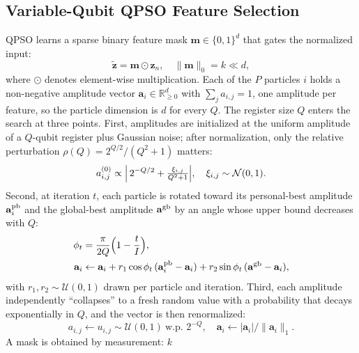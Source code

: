 \documentclass[conference]{IEEEtran}
\begin{document}
\subsection{Variable-Qubit QPSO Feature Selection}
\label{subsec:qpsomethod}

QPSO learns a sparse binary feature mask
$\mathbf{m}\in\{0,1\}^d$ that gates the normalized input:
\begin{equation}
\tilde{\mathbf{z}} = \mathbf{m}\odot\mathbf{z}_n,\quad
\|\mathbf{m}\|_0 = k \ll d,
\label{eq:mask_gate}
\end{equation}
where $\odot$ denotes element-wise multiplication.
Each of the $P$ particles $i$ holds a
non-negative amplitude vector $\mathbf{a}_i\in\mathbb{R}_{\ge 0}^{d}$
with $\sum_j a_{i,j}=1$, one amplitude per feature, so the particle
dimension is $d$ for every $Q$. The register size $Q$ enters the
search at three points. First, amplitudes are initialized at the
uniform amplitude of a $Q$-qubit register plus Gaussian noise; after
normalization, only the relative perturbation
$\rho(Q)=2^{Q/2}/(Q^{2}+1)$ matters:
\begin{equation}
a_{i,j}^{(0)} \propto \Bigl|\,2^{-Q/2} +
\tfrac{\xi_{i,j}}{Q^{2}+1}\Bigr|,\quad
\xi_{i,j}\sim\mathcal{N}(0,1).
\label{eq:qpso_init}
\end{equation}
Second, at iteration $t$, each particle is
rotated toward its personal-best amplitude $\mathbf{a}_i^{\rm pb}$
and the global-best amplitude $\mathbf{a}^{\rm gb}$ by an angle whose
upper bound decreases with $Q$:
\begin{align}
\phi_t &= \frac{\pi}{2Q}\Bigl(1-\frac{t}{I}\Bigr),
\label{eq:qpso_angle}\\
\mathbf{a}_i &\leftarrow \mathbf{a}_i
+ r_1\cos\phi_t\,(\mathbf{a}_i^{\rm pb}-\mathbf{a}_i)
+ r_2\sin\phi_t\,(\mathbf{a}^{\rm gb}-\mathbf{a}_i),
\label{eq:qpso_rotation}
\end{align}
with $r_1,r_2\sim\mathcal{U}(0,1)$ drawn per
particle and iteration. Third, each amplitude independently
``collapses'' to a fresh random value with a probability that decays
exponentially in $Q$, and the vector is then renormalized:
\begin{equation}
a_{i,j} \leftarrow u_{i,j}\sim\mathcal{U}(0,1)
\ \text{w.p. } 2^{-Q},\quad
\mathbf{a}_i \leftarrow |\mathbf{a}_i| / \|\mathbf{a}_i\|_1 .
\label{eq:qpso_collapse}
\end{equation}
A mask is obtained by measurement: $k$
\end{document}
